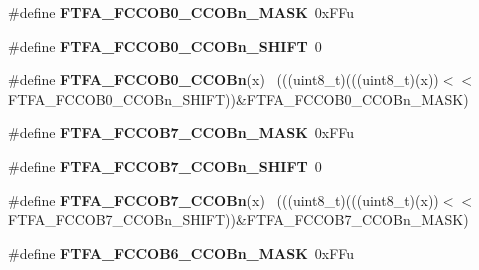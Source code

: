 \begin{DoxyCompactItemize}
\item 
\hypertarget{group___f_t_f_a___register___masks_ga5b8b3b721c731e331fb126491693baf4}{}\#define {\bfseries F\+T\+F\+A\+\_\+\+F\+C\+C\+O\+B0\+\_\+\+C\+C\+O\+Bn\+\_\+\+M\+A\+S\+K}~0x\+F\+Fu\label{group___f_t_f_a___register___masks_ga5b8b3b721c731e331fb126491693baf4}

\item 
\hypertarget{group___f_t_f_a___register___masks_gaab9715b8a9e69d256acd31421b32ce97}{}\#define {\bfseries F\+T\+F\+A\+\_\+\+F\+C\+C\+O\+B0\+\_\+\+C\+C\+O\+Bn\+\_\+\+S\+H\+I\+F\+T}~0\label{group___f_t_f_a___register___masks_gaab9715b8a9e69d256acd31421b32ce97}

\item 
\hypertarget{group___f_t_f_a___register___masks_gac4b11f6b09b2e43e3819451450944db2}{}\#define {\bfseries F\+T\+F\+A\+\_\+\+F\+C\+C\+O\+B0\+\_\+\+C\+C\+O\+Bn}(x)                                      ~(((uint8\+\_\+t)(((uint8\+\_\+t)(x))$<$$<$F\+T\+F\+A\+\_\+\+F\+C\+C\+O\+B0\+\_\+\+C\+C\+O\+Bn\+\_\+\+S\+H\+I\+F\+T))\&F\+T\+F\+A\+\_\+\+F\+C\+C\+O\+B0\+\_\+\+C\+C\+O\+Bn\+\_\+\+M\+A\+S\+K)\label{group___f_t_f_a___register___masks_gac4b11f6b09b2e43e3819451450944db2}

\item 
\hypertarget{group___f_t_f_a___register___masks_ga0fe4a465120d3602ebe4c144d3905534}{}\#define {\bfseries F\+T\+F\+A\+\_\+\+F\+C\+C\+O\+B7\+\_\+\+C\+C\+O\+Bn\+\_\+\+M\+A\+S\+K}~0x\+F\+Fu\label{group___f_t_f_a___register___masks_ga0fe4a465120d3602ebe4c144d3905534}

\item 
\hypertarget{group___f_t_f_a___register___masks_ga4281fe52969c1c18536f869c7cf8d2ac}{}\#define {\bfseries F\+T\+F\+A\+\_\+\+F\+C\+C\+O\+B7\+\_\+\+C\+C\+O\+Bn\+\_\+\+S\+H\+I\+F\+T}~0\label{group___f_t_f_a___register___masks_ga4281fe52969c1c18536f869c7cf8d2ac}

\item 
\hypertarget{group___f_t_f_a___register___masks_ga95698ad599e68674c4924e69b78fece0}{}\#define {\bfseries F\+T\+F\+A\+\_\+\+F\+C\+C\+O\+B7\+\_\+\+C\+C\+O\+Bn}(x)                                      ~(((uint8\+\_\+t)(((uint8\+\_\+t)(x))$<$$<$F\+T\+F\+A\+\_\+\+F\+C\+C\+O\+B7\+\_\+\+C\+C\+O\+Bn\+\_\+\+S\+H\+I\+F\+T))\&F\+T\+F\+A\+\_\+\+F\+C\+C\+O\+B7\+\_\+\+C\+C\+O\+Bn\+\_\+\+M\+A\+S\+K)\label{group___f_t_f_a___register___masks_ga95698ad599e68674c4924e69b78fece0}

\item 
\hypertarget{group___f_t_f_a___register___masks_ga35746ac0168b284ea3f29b1b6f47d932}{}\#define {\bfseries F\+T\+F\+A\+\_\+\+F\+C\+C\+O\+B6\+\_\+\+C\+C\+O\+Bn\+\_\+\+M\+A\+S\+K}~0x\+F\+Fu\label{group___f_t_f_a___register___masks_ga35746ac0168b284ea3f29b1b6f47d932}


\end{DoxyCompactItemize}
